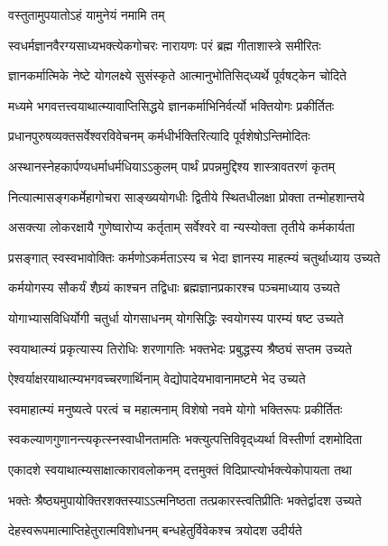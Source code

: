 
{वस्तुतामुपयातोऽहं यामुनेयं नमामि तम्}

\twolineshloka
{स्वधर्मज्ञानवैरग्यसाध्यभक्त्येकगोचरः}
{नारायणः परं ब्रह्म गीताशास्त्रे समीरितः}

\twolineshloka
{ज्ञानकर्मात्मिके नेष्टे योगलक्ष्ये सुसंस्कृते}
{आत्मानुभोतिसिद्‌ध्यर्थे पूर्वषट्केन चोदिते}

\twolineshloka
{मध्यमे भगवत्तत्त्वयाथात्म्यावाप्तिसिद्धये}
{ज्ञानकर्माभिनिर्वर्त्यो भक्तियोगः प्रकीर्तितः}

\twolineshloka
{प्रधानपुरुषव्यक्तसर्वेश्वरविवेचनम्}
{कर्मधीर्भक्तिरित्यादि पूर्वशेषोऽन्तिमोदितः}

\twolineshloka
{अस्थानस्नेहकार्पण्यधर्माधर्मधियाऽऽकुलम्}
{पार्थं प्रपन्नमुद्दिश्य शास्त्रावतरणं कृतम्}

\twolineshloka
{नित्यात्मासङ्गकर्मेहागोचरा साङ्ख्ययोगधीः}
{द्वितीये स्थितधीलक्षा प्रोक्ता तन्मोहशान्तये}

\twolineshloka
{असक्त्या लोकरक्षायै गुणेष्वारोप्य कर्तृताम्}
{सर्वेश्वरे वा न्यस्योक्ता तृतीये कर्मकार्यता}

\twolineshloka
{प्रसङ्गात् स्वस्वभावोक्तिः कर्मणोऽकर्मताऽस्य च}
{भेदा ज्ञानस्य माहत्म्यं चतुर्थाध्याय उच्यते}

\twolineshloka
{कर्मयोगस्य सौकर्यं शैघ्र्यं काश्चन तद्विधाः}
{ब्रह्मज्ञानप्रकारश्च पञ्चमाध्याय उच्यते}

\twolineshloka
{योगाभ्यासविधिर्योगी चतुर्धा योगसाधनम्}
{योगसिद्धिः स्वयोगस्य पारम्यं षष्ट उच्यते}

\twolineshloka
{स्वयाथात्म्यं प्रकृत्यास्य तिरोधिः शरणागतिः}
{भक्तभेदः प्रबुद्धस्य श्रैष्ठ्यं सप्तम उच्यते}

\twolineshloka
{ऐश्वर्याक्षरयाथात्म्यभगवच्चरणार्थिनाम्}
{वेद्योपादेयभावानामष्टमे भेद उच्यते}

\twolineshloka
{स्वमाहात्म्यं मनुष्यत्वे परत्वं च महात्मनाम्}
{विशेषो नवमे योगो भक्तिरूपः प्रकीर्तितः}

\twolineshloka
{स्वकल्याणगुणानन्त्यकृत्स्नस्वाधीनतामतिः}
{भक्त्युत्पत्तिविवृद्‌ध्यर्था विस्तीर्णा दशमोदिता}

\twolineshloka
{एकादशे स्वयाथात्म्यसाक्षात्कारावलोकनम्}
{दत्तमुक्तं विदिप्राप्त्योर्भक्त्येकोपायता तथा}

\twolineshloka
{भक्तेः श्रैष्ठ्यमुपायोक्तिरशक्तस्याऽऽत्मनिष्ठता}
{तत्प्रकारस्त्वतिप्रीतिः भक्तेर्द्वादश उच्यते}

\twolineshloka
{देहस्वरूपमात्माप्तिहेतुरात्मविशोधनम्}
{बन्धहेतुर्विवेकश्च त्रयोदश उदीर्यते}

